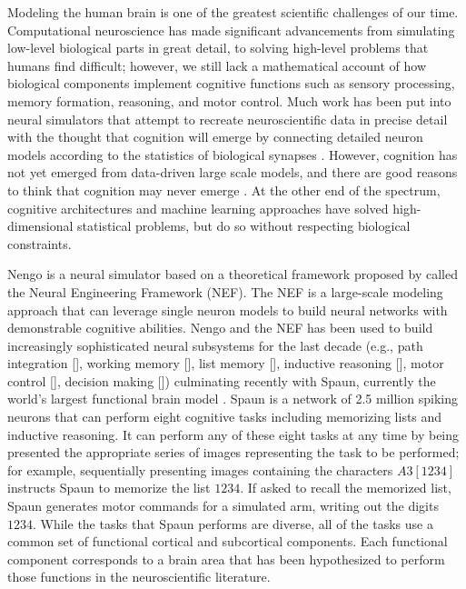 \documentclass{frontiersSCNS}
\begin{document}
Modeling the human brain
is one of the greatest
scientific challenges of our time.
Computational neuroscience
has made significant advancements
from simulating low-level biological parts in great detail,
to solving high-level problems that humans find difficult;
however, we still lack a mathematical account of
how biological components
implement cognitive functions such as sensory processing,
memory formation, reasoning, and motor control.
Much work has been put into neural simulators
that attempt to recreate neuroscientific
data in precise detail with the thought that
cognition will emerge by connecting
detailed neuron models according
to the statistics of biological synapses \citep{markram2006}.
However, cognition has not yet emerged
from data-driven large scale models,
and there are good reasons to think
that cognition may never emerge \citep{trujillo-inpress}.
At the other end of the spectrum,
cognitive architectures \citep{anderson2004}
and machine learning approaches \citep{hinton2006}
have solved high-dimensional statistical problems,
but do so without respecting biological constraints.

Nengo is a neural simulator
based on a theoretical framework proposed
by \citet{eliasmith2003}
called the Neural Engineering Framework
(NEF).
The NEF is a large-scale modeling approach
that can leverage single neuron models
to build neural networks with
demonstrable cognitive abilities.
Nengo and the NEF has been used to build
increasingly sophisticated neural subsystems
for the last decade
(e.g., path integration [\citealp{conklin2005}],
working memory [\citealp{singh2006}],
list memory [\citealp{choo2010}],
inductive reasoning [\citealp{rasmussen2011}],
motor control [\citealp{dewolf2011}],
decision making [\citealp{stewart2012}])
culminating recently with Spaun,
currently the world's
largest functional brain model \citep{eliasmith2012}.
Spaun is a network of 2.5 million spiking neurons
that can perform eight cognitive tasks
including memorizing lists and inductive reasoning.
It can perform any of these eight tasks
at any time by being presented
the appropriate series of images
representing the task to be performed;
for example, sequentially presenting images
containing the characters $A3[1234]$ instructs Spaun
to memorize the list $1234$.
If asked to recall the memorized list,
Spaun generates motor commands for a simulated arm,
writing out the digits $1234$.
While the tasks that Spaun performs are diverse,
all of the tasks use a common set of
functional cortical and subcortical components.
Each functional component corresponds
to a brain area that has been hypothesized
to perform those functions
in the neuroscientific literature.
\end{document}
